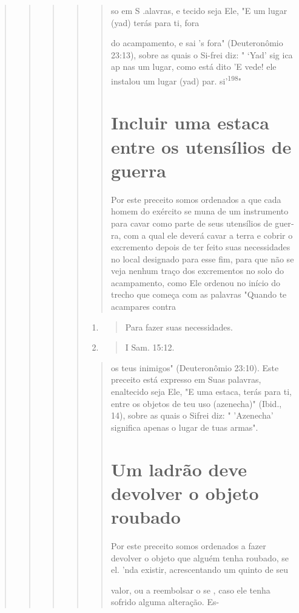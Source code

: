 \begin{quote}
\begin{quote}
\begin{quote}
\begin{quote}
\begin{quote}
so em S .alavras, e tecido seja Ele, "E um lugar (yad) terás para ti,
fora

do acampamento, e sai 's fora" (Deuteronômio 23:13), sobre as quais o
Si-frei diz: " `Yad' sig ica ap nas um lugar, como está dito 'E vede!
ele instalou um lugar (yad) par. si'\textsuperscript{198}"

\section{Incluir uma estaca entre os utensílios de guerra}

Por este preceito somos ordenados a que cada homem do exército se muna
de um instrumento para cavar como parte de seus utensílios de guer­ra,
com a qual ele deverá cavar a terra e cobrir o excremento depois de ter
feito suas necessidades no local designado para esse fim, para que não
se veja ne­nhum traço dos excrementos no solo do acampamento, como Ele
ordenou no início do trecho que começa com as palavras "Quando te
acampares contra
\end{quote}

\begin{enumerate}
\def\labelenumi{\arabic{enumi}.}
\setcounter{enumi}{196}
\item
 \begin{quote}
 Para fazer suas necessidades.
 \end{quote}
\item
 \begin{quote}
 I Sam. 15:12.
 \end{quote}
\end{enumerate}

\begin{quote}


os teus inimigos" (Deuteronômio 23:10). Este preceito está expresso em
Suas palavras, enaltecido seja Ele, "E uma estaca, terás para ti, entre
os objetos de teu uso (azenecha)" (Ibid., 14), sobre as quais o Sifrei
diz: " 'Azenecha' signifi­ca apenas o lugar de tuas armas".

\section{Um ladrão deve devolver o objeto roubado}

Por este preceito somos ordenados a fazer devolver o objeto que alguém
tenha roubado, se el. 'nda existir, acrescentando um
quinto de seu

valor, ou a reembolsar o se , caso ele tenha sofrido alguma alteração.
Es-


\end{quote}
\end{quote}
\end{quote}
\end{quote}
\end{quote}

